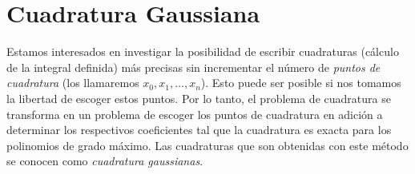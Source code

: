 

\chapter{Cuadratura Gaussiana}
\label{cha:cuadratura-gauss}

  Estamos interesados en investigar la posibilidad de escribir cuadraturas
  (cálculo de la integral definida)
  más precisas sin incrementar el número de \emph{puntos de cuadratura}
  (los llamaremos \(x_0, x_1, \dotsc, x_n\)).
  Esto puede ser posible si nos tomamos la libertad de escoger estos puntos.
  Por lo tanto,
  el problema de cuadratura se transforma
  en un problema de escoger los puntos de cuadratura
  en adición a determinar los respectivos coeficientes
  tal que la cuadratura es exacta para los polinomios de grado máximo.
  Las cuadraturas que son obtenidas con este método
  se conocen como \emph{cuadratura gaussianas}.

